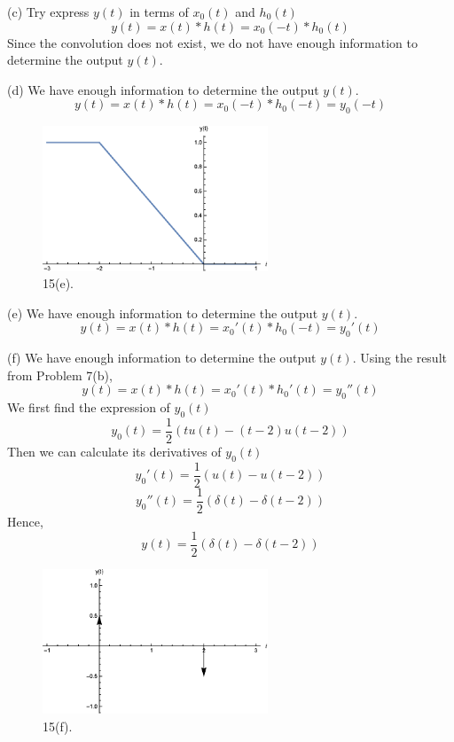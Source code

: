 \documentclass[a4paper]{article}
\begin{document}
(c) Try express $y(t)$ in terms of $x_0(t)$ and $h_0(t)$
$$y(t)=x(t)*h(t)=x_0(-t)*h_0(t)$$
Since the convolution does not exist, we do not have enough information to determine the output $y(t)$.

(d) We have enough information to determine the output $y(t)$.
$$\boxed{y(t)=x(t)*h(t)=x_0(-t)*h_0(-t)=y_0(-t)}$$
\begin{figure}[H]
    \begin{center}
        \includegraphics[width=0.6\textwidth]{15(e).eps}
    \end{center}
    \caption{15(e).}
\end{figure}

(e) We have enough information to determine the output $y(t)$.
$$\boxed{y(t)=x(t)*h(t)=x_0'(t)*h_0(-t)=y_0'(t)}$$

(f) We have enough information to determine the output $y(t)$. Using the result from Problem 7(b),
$$y(t)=x(t)*h(t)=x_0'(t)*h_0'(t)=y_0''(t)$$
We first find the expression of $y_0(t)$
$$y_0(t)=\frac{1}{2}(tu(t)-(t-2)u(t-2))$$
Then we can calculate its derivatives of $y_0(t)$
$$y_0'(t)=\frac{1}{2}(u(t)-u(t-2))$$
$$y_0''(t)=\frac{1}{2}(\delta(t)-\delta(t-2))$$
Hence,
$$\boxed{y(t)=\frac{1}{2}(\delta(t)-\delta(t-2))}$$
\begin{figure}[H]
    \begin{center}
        \includegraphics[width=0.6\textwidth]{15(f).eps}
    \end{center}
    \caption{15(f).}
\end{figure}
\end{document}

